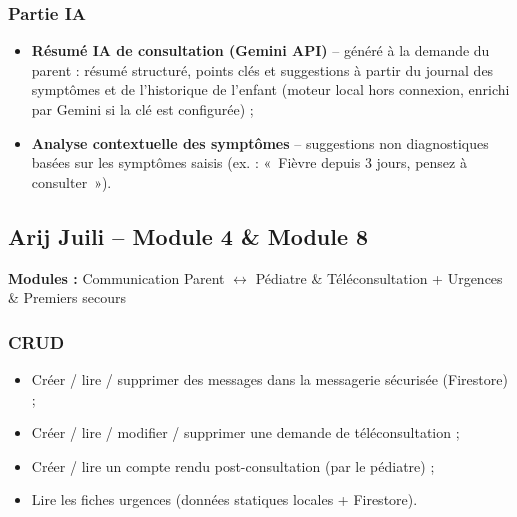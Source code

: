 \documentclass[11pt,a4paper]{article}
\begin{document}
\subsubsection*{Partie IA}
\begin{itemize}
  \item \textbf{Résumé IA de consultation (Gemini API)} -- généré à la demande du parent : résumé structuré, points clés et suggestions à partir du journal des symptômes et de l'historique de l'enfant (moteur local hors connexion, enrichi par Gemini si la clé est configurée) ;
  \item \textbf{Analyse contextuelle des symptômes} -- suggestions non diagnostiques basées sur les symptômes saisis (ex. : «~Fièvre depuis 3 jours, pensez à consulter~»).
\end{itemize}

\vspace{0.5cm}
\subsection{Arij Juili -- Module 4 \& Module 8}

\textbf{Modules :} Communication Parent $\leftrightarrow$ Pédiatre \& Téléconsultation + Urgences \& Premiers secours

\subsubsection*{CRUD}
\begin{itemize}
  \item Créer / lire / supprimer des messages dans la messagerie sécurisée (Firestore) ;
  \item Créer / lire / modifier / supprimer une demande de téléconsultation ;
  \item Créer / lire un compte rendu post-consultation (par le pédiatre) ;
  \item Lire les fiches urgences (données statiques locales + Firestore).
\end{itemize}
\end{document}

